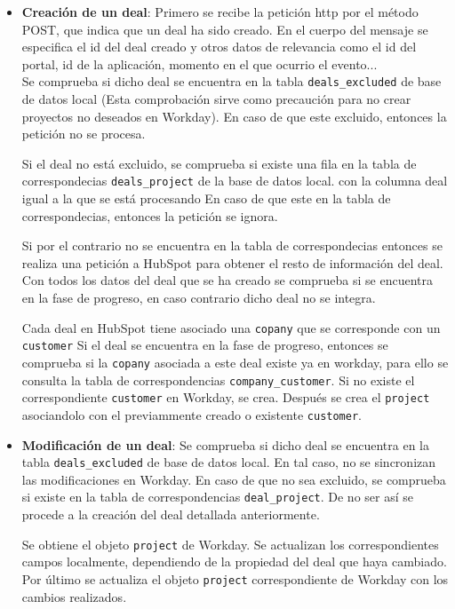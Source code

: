 \begin{itemize}
	\item \textbf{Creación de un deal}: Primero se recibe la petición \acrshort{http} por el método POST, que indica que un deal ha sido creado. En el cuerpo del mensaje se especifica el id del deal creado y otros datos de relevancia como el id del portal, id de la aplicación, momento en el que ocurrio el evento... \\
	
		Se comprueba si dicho deal se encuentra en la tabla \verb|deals_excluded| de base de datos local (Esta comprobación sirve como precaución para no crear proyectos no deseados en Workday).
		En caso de que este excluido, entonces la petición no se procesa.
		
		Si el deal no está excluido, se comprueba si existe una fila en la tabla de correspondecias \verb|deals_project| de la base de datos local.
		con la columna deal igual a la que se está procesando %
		En caso de que este en la tabla de correspondecias, entonces la petición se ignora.

		Si por el contrario no se encuentra en la tabla de correspondecias entonces se realiza una petición a HubSpot para obtener el resto de información del deal.
		Con todos los datos del deal que se ha creado se comprueba si se encuentra en la fase de progreso, en caso contrario dicho deal no se integra.
		
		
		
		Cada deal en HubSpot tiene asociado una \verb|copany| que se corresponde con un \verb|customer|
		Si el deal se encuentra en la fase de progreso, entonces se comprueba si la \verb|copany| asociada a este deal existe ya en workday, para ello se consulta la tabla de correspondencias \verb|company_customer|. Si no existe el correspondiente \verb|customer| en Workday, se crea.
		Después se crea el \verb|project| asociandolo con el previammente creado o existente \verb|customer|.
		
		
		
		
		
	\item \textbf{Modificación de un deal}:
		Se comprueba si dicho deal se encuentra en la tabla \verb|deals_excluded| de base de datos local. En tal caso, no se sincronizan las modificaciones en Workday.
		En caso de que no sea excluido, se comprueba si existe en la tabla de correspondencias \verb|deal_project|. De no ser así se procede a la creación del deal detallada anteriormente.
		
		
		
		Se obtiene el objeto \verb|project| de Workday. Se actualizan los correspondientes campos localmente, dependiendo de la propiedad del deal que haya cambiado. Por último se actualiza el objeto \verb|project| correspondiente de Workday con los cambios realizados.
		
		
		

\end{itemize}



